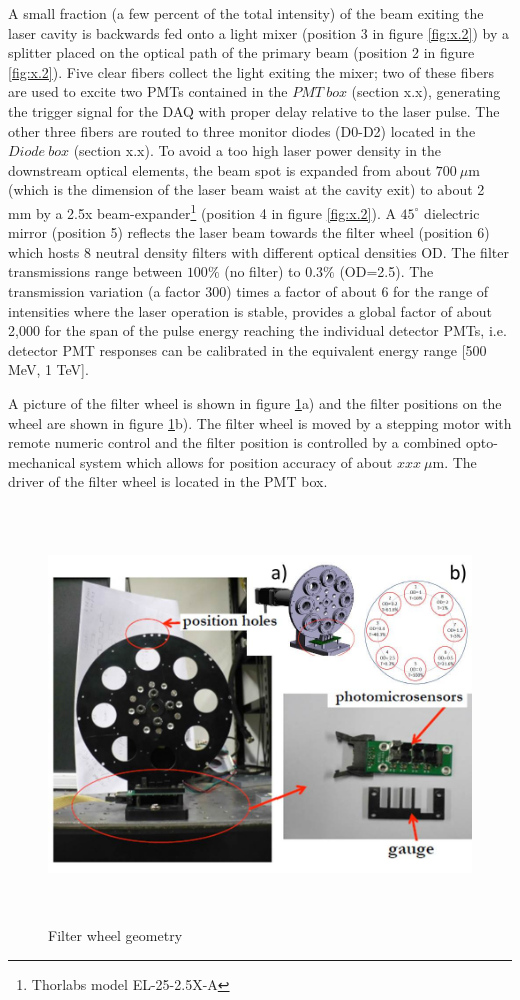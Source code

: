 A small fraction (a few percent of the total intensity) of the beam exiting the
laser cavity is backwards fed onto a light mixer (position 3 in figure 
\ref{fig:x.2}) by a splitter placed on the optical path of the primary beam
(position 2 in figure \ref{fig:x.2}). Five clear fibers collect the light exiting
the mixer; two of these fibers are used to excite two PMTs contained in the $PMT
~box$ (section x.x), generating the trigger signal for the DAQ with proper delay
relative to the laser pulse. The other three fibers are routed to three monitor
diodes (D0-D2) located in the $Diode ~box$ (section x.x).  To avoid a too high laser
power density in the downstream optical elements, the beam spot is expanded from
about $700 ~\mu$m
(which is the dimension of the laser beam waist at the cavity exit) to about 2 mm by
a 2.5x beam-expander\footnote{Thorlabs model EL-25-2.5X-A} (position 4 in figure
\ref{fig:x.2}). A $45^{\circ}$ dielectric mirror (position 5) reflects the laser
beam towards the filter wheel (position 6) which hosts 8 neutral density filters
with different optical densities OD. The filter transmissions range between $100\%$
(no filter) to $0.3\%$ (OD=2.5). The transmission variation (a factor 300) times a
factor of about 6 for the range of intensities where the laser operation is stable,
provides a global factor of about 2,000 for the span of the pulse energy reaching
the individual detector PMTs, i.e. detector PMT responses can be calibrated in the
equivalent energy range [500 MeV, 1 TeV].

A picture of the filter wheel is shown in figure \ref{fig:x.3}a) and the filter
positions on the wheel are shown in figure \ref{fig:x.3}b). The filter wheel is
moved by a stepping motor with remote numeric control and the filter position is
controlled by a combined opto-mechanical system which allows for 
position accuracy of about  $xxx ~\mu$m. The driver of the filter wheel is located
in the PMT box.
% 
\begin{figure}[htb]
\begin{center} 
\includegraphics[width=16cm, height=11cm]{figures/Filter_wheel}
\caption{Filter wheel geometry
}\label{fig:x.3}
\end{center}
\end{figure}
%

